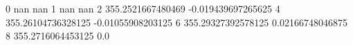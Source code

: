 0 nan nan
1 nan nan
2 355.2521667480469 -0.019439697265625
4 355.26104736328125 -0.01055908203125
6 355.29327392578125 0.02166748046875
8 355.2716064453125 0.0
